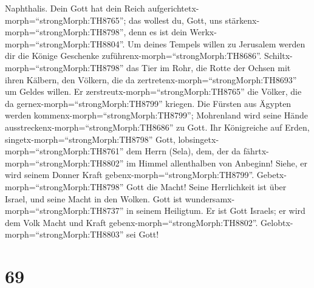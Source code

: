Naphthalis.  Dein Gott hat dein Reich
aufgerichtetx-morph=``strongMorph:TH8765''; das wollest du, Gott, uns
stärkenx-morph=``strongMorph:TH8798'', denn es ist dein
Werkx-morph=``strongMorph:TH8804''.  Um deines Tempels
willen zu Jerusalem werden dir die Könige Geschenke
zuführenx-morph=``strongMorph:TH8686''. 
Schiltx-morph=``strongMorph:TH8798'' das Tier im Rohr, die Rotte der
Ochsen mit ihren Kälbern, den Völkern, die da
zertretenx-morph=``strongMorph:TH8693'' um Geldes willen. Er
zerstreutx-morph=``strongMorph:TH8765'' die Völker, die da
gernex-morph=``strongMorph:TH8799'' kriegen.  Die Fürsten
aus Ägypten werden kommenx-morph=``strongMorph:TH8799''; Mohrenland wird
seine Hände ausstreckenx-morph=``strongMorph:TH8686'' zu Gott.
 Ihr Königreiche auf Erden,
singetx-morph=``strongMorph:TH8798'' Gott,
lobsingetx-morph=``strongMorph:TH8761'' dem Herrn (Sela), 
dem, der da fährtx-morph=``strongMorph:TH8802'' im Himmel allenthalben
von Anbeginn! Siehe, er wird seinem Donner Kraft
gebenx-morph=``strongMorph:TH8799''. 
Gebetx-morph=``strongMorph:TH8798'' Gott die Macht! Seine Herrlichkeit
ist über Israel, und seine Macht in den Wolken.  Gott ist
wundersamx-morph=``strongMorph:TH8737'' in seinem Heiligtum. Er ist Gott
Israels; er wird dem Volk Macht und Kraft
gebenx-morph=``strongMorph:TH8802''.
Gelobtx-morph=``strongMorph:TH8803'' sei Gott!

\hypertarget{section-68}{%
\section{69}\label{section-68}}

